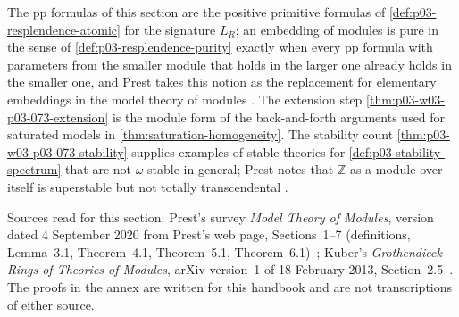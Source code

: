 The pp formulas of this section are the positive primitive formulas of
\cref{def:p03-resplendence-atomic} for the signature \(L_R\);
an embedding of modules is pure in the sense of
\cref{def:p03-resplendence-purity} exactly when every pp formula with
parameters from the smaller module that holds in the larger one already
holds in the smaller one, and Prest takes this notion as the replacement
for elementary embeddings in the model theory of modules
\cite[\S2]{Prest2020ModelTheoryModules}. The extension step
\cref{thm:p03-w03-p03-073-extension} is the module form of the
back-and-forth arguments used for saturated models in
\cref{thm:saturation-homogeneity}. The stability count
\cref{thm:p03-w03-p03-073-stability} supplies examples of stable theories
for \cref{def:p03-stability-spectrum} that are not \(\omega\)-stable in
general; Prest notes that \(\mathbb Z\) as a module over itself is
superstable but not totally transcendental
\cite[\S6]{Prest2020ModelTheoryModules}.

Sources read for this section: Prest's survey \emph{Model Theory of
Modules}, version dated 4 September 2020 from Prest's web page,
Sections~1--7 (definitions, Lemma~3.1, Theorem~4.1, Theorem~5.1,
Theorem~6.1)~\cite{Prest2020ModelTheoryModules}; Kuber's
\emph{Grothendieck Rings of Theories of Modules}, arXiv version~1 of
18 February 2013, Section~2.5~\cite{Kuber2013GrothendieckModules}. The proofs in the annex are written
for this handbook and are not transcriptions of either source.
